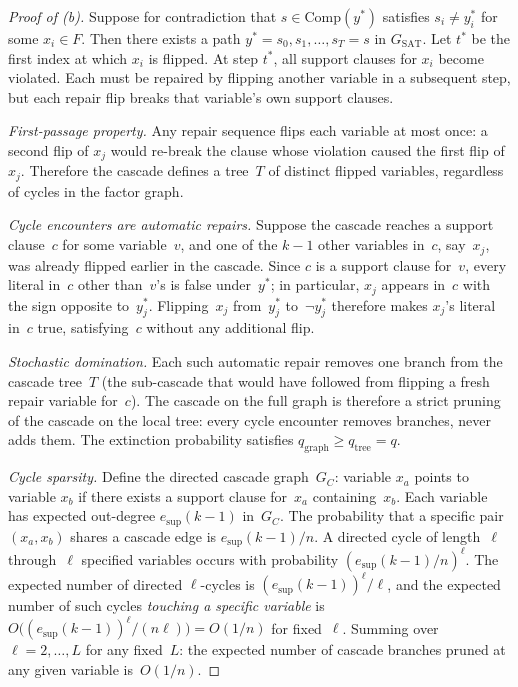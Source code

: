 \documentclass[11pt]{article}
\begin{document}
\begin{proof}[Proof of (b)]
Suppose for contradiction that $s \in \mathrm{Comp}(y^*)$ satisfies $s_i \neq y^*_i$ for some $x_i \in F$.  Then there exists a path $y^* = s_0, s_1, \ldots, s_T = s$ in $G_{\mathrm{SAT}}$.  Let $t^*$ be the first index at which $x_i$ is flipped.  At step $t^*$, all support clauses for $x_i$ become violated.  Each must be repaired by flipping another variable in a subsequent step, but each repair flip breaks that variable's own support clauses.

\emph{First-passage property.}  Any repair sequence flips each variable at most once: a second flip of $x_j$ would re-break the clause whose violation caused the first flip of~$x_j$.  Therefore the cascade defines a tree~$T$ of distinct flipped variables, regardless of cycles in the factor graph.

\emph{Cycle encounters are automatic repairs.}  Suppose the cascade reaches a support clause~$c$ for some variable~$v$, and one of the $k-1$ other variables in~$c$, say~$x_j$, was already flipped earlier in the cascade.  Since $c$ is a support clause for~$v$, every literal in~$c$ other than~$v$'s is false under~$y^*$; in particular, $x_j$ appears in~$c$ with the sign opposite to~$y^*_j$.  Flipping~$x_j$ from~$y^*_j$ to~$\neg y^*_j$ therefore makes $x_j$'s literal in~$c$ true, satisfying~$c$ without any additional flip.

\emph{Stochastic domination.}  Each such automatic repair removes one branch from the cascade tree~$T$ (the sub-cascade that would have followed from flipping a fresh repair variable for~$c$).  The cascade on the full graph is therefore a strict pruning of the cascade on the local tree: every cycle encounter removes branches, never adds them.  The extinction probability satisfies $q_{\mathrm{graph}} \geq q_{\mathrm{tree}} = q$.

\emph{Cycle sparsity.}  Define the directed cascade graph~$G_C$: variable $x_a$ points to variable $x_b$ if there exists a support clause for~$x_a$ containing~$x_b$.  Each variable has expected out-degree $e_{\mathrm{sup}}(k-1)$ in~$G_C$.  The probability that a specific pair $(x_a, x_b)$ shares a cascade edge is $e_{\mathrm{sup}}(k-1)/n$.  A directed cycle of length~$\ell$ through~$\ell$ specified variables occurs with probability $(e_{\mathrm{sup}}(k-1)/n)^\ell$.  The expected number of directed $\ell$-cycles is $(e_{\mathrm{sup}}(k-1))^\ell / \ell$, and the expected number of such cycles \emph{touching a specific variable} is $O\bigl((e_{\mathrm{sup}}(k-1))^\ell / (n\ell)\bigr) = O(1/n)$ for fixed~$\ell$.  Summing over $\ell = 2, \ldots, L$ for any fixed~$L$: the expected number of cascade branches pruned at any given variable is~$O(1/n)$.


\end{proof}
\end{document}
